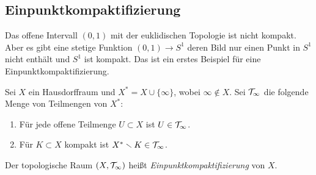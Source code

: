 \subsection{Einpunktkompaktifizierung}
Das offene Intervall $(0,1)$ mit der euklidischen Topologie ist nicht kompakt. Aber es gibt eine stetige Funktion $(0,1)\to S^1$ deren Bild nur einen Punkt in $S^1$ nicht enthält und $S^1$ ist kompakt. Das ist ein erstes Beispiel für eine Einpunktkompaktifizierung.

\begin{definition}
Sei $X$ ein Hausdorffraum und $X^* = X\cup\{\infty\}$, wobei $\infty\not\in X$. Sei $\cal T_\infty$ die folgende Menge von Teilmengen von $X^*$:
\begin{enumerate}
\item Für jede offene Teilmenge $U\subset X$ ist $U\in\cal T_\infty$.
\item Für $K\subset X$ kompakt ist $X^*\setminus K\in\cal T_\infty$.
\end{enumerate}
Der topologische Raum $(X,\cal T_\infty)$ heißt \emph{Einpunktkompaktifizierung} von $X$.
\end{definition}

